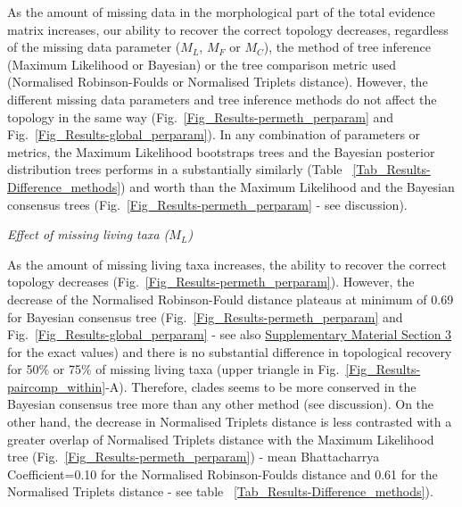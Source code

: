 \documentclass[12pt,letterpaper]{article}
\renewcommand{\subsection}[1]{%
\bigskip
\begin{center}
\begin{large}
\normalfont\itshape #1
\end{large}
\end{center}}
\begin{document}

As the amount of missing data in the morphological part of the total evidence matrix increases, our ability to recover the correct topology decreases, regardless of the missing data parameter ($M_{L}$, $M_{F}$ or $M_{C}$), the method of tree inference (Maximum Likelihood or Bayesian) or the tree comparison metric used (Normalised Robinson-Foulds or Normalised Triplets distance). However, the different missing data parameters and tree inference methods do not affect the topology in the same way (Fig.~\ref{Fig_Results-permeth_perparam} and Fig.~\ref{Fig_Results-global_perparam}). In any combination of parameters or metrics, the Maximum Likelihood bootstraps trees and the Bayesian posterior distribution trees performs in a substantially similarly (Table ~\ref{Tab_Results-Difference_methods}) and worth than the Maximum Likelihood and the Bayesian consensus trees (Fig.~\ref{Fig_Results-permeth_perparam} - see discussion). %

\subsection{Effect of missing living taxa ($M_{L}$)} %
As the amount of missing living taxa increases, the ability to recover the correct topology decreases (Fig.~\ref{Fig_Results-permeth_perparam}). However, the decrease of the Normalised Robinson-Fould distance plateaus at minimum of 0.69 for Bayesian consensus tree (Fig.~\ref{Fig_Results-permeth_perparam} and Fig.~\ref{Fig_Results-global_perparam} - see also \hyperref[SupplementaryMaterial]{Supplementary Material Section 3} for the exact values) and there is no substantial difference in topological recovery for 50\% or 75\% of missing living taxa (upper triangle in Fig.~\ref{Fig_Results-paircomp_within}-A). Therefore, clades seems to be more conserved in the Bayesian consensus tree more than any other method (see discussion).  %
On the other hand, the decrease in Normalised Triplets distance is less contrasted with a greater overlap of Normalised Triplets distance with the Maximum Likelihood tree (Fig.~\ref{Fig_Results-permeth_perparam}) - mean Bhattacharrya Coefficient=0.10 for the Normalised Robinson-Foulds distance and 0.61 for the Normalised Triplets distance - see table ~\ref{Tab_Results-Difference_methods}).
\end{document}
